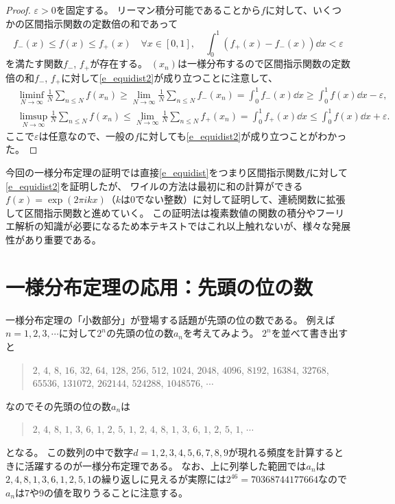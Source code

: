 \begin{proof}
$\varepsilon > 0$を固定する。
リーマン積分可能であることから$f$に対して、いくつかの区間指示関数の定数倍の和であって
$$
f_-(x) \le f(x) \le f_+(x) \quad \forall x \in [0, 1], \quad \int_0^1 (f_+(x)-f_-(x))\dd{x} < \varepsilon
$$
を満たす関数$f_-$, $f_+$が存在する。
$(x_n)$は一様分布するので区間指示関数の定数倍の和$f_-$, $f_+$に対して\eqref{e_equidist2}が成り立つことに注意して、
\begin{align*}
&\liminf_{N \to \infty}\frac{1}{N}\sum_{n \le N}f(x_n) \ge \lim_{N \to \infty}\frac{1}{N}\sum_{n \le N}f_-(x_n) = \int_0^1 f_-(x)\dd{x} \ge \int_0^1 f(x)\dd{x}-\varepsilon, \\
&\limsup_{N \to \infty}\frac{1}{N}\sum_{n \le N}f(x_n) \le \lim_{N \to \infty}\frac{1}{N}\sum_{n \le N}f_+(x_n) = \int_0^1 f_+(x)\dd{x} \le \int_0^1 f(x)\dd{x}+\varepsilon.
\end{align*}
ここで$\varepsilon$は任意なので、一般の$f$に対しても\eqref{e_equidist2}が成り立つことがわかった。
\end{proof}

\begin{remark}
今回の一様分布定理の証明では直接\eqref{e_equidist}をつまり区間指示関数$f$に対して\eqref{e_equidist2}を証明したが、
ワイルの方法は最初に和の計算ができる$f(x) = \exp(2\pi i k x)$（$k$は$0$でない整数）に対して証明して、連続関数に拡張して区間指示関数と進めていく。
この証明法は複素数値の関数の積分やフーリエ解析の知識が必要になるため本テキストではこれ以上触れないが、様々な発展性があり重要である。
\end{remark}

\section{一様分布定理の応用：先頭の位の数}

一様分布定理の「小数部分」が登場する話題が先頭の位の数である。
例えば$n = 1, 2, 3, \cdots$に対して$2^n$の先頭の位の数$a_n$を考えてみよう。
$2^n$を並べて書き出すと
\begin{quote}
$2$, $4$, $8$, $16$, $32$, $64$, $128$, $256$, $512$, $1024$, $2048$, $4096$, $8192$, $16384$, $32768$, $65536$, $131072$, $262144$, $524288$, $1048576$, $\cdots$
\end{quote}
なのでその先頭の位の数$a_n$は
\begin{quote}
$2$, $4$, $8$, $1$, $3$, $6$, $1$, $2$, $5$, $1$, $2$, $4$, $8$, $1$, $3$, $6$, $1$, $2$, $5$, $1$, $\cdots$
\end{quote}
となる。
この数列の中で数字$d = 1, 2, 3, 4, 5, 6, 7, 8, 9$が現れる頻度を計算するときに活躍するのが一様分布定理である。
なお、上に列挙した範囲では$a_n$は$2, 4, 8, 1, 3, 6, 1, 2, 5, 1$の繰り返しに見えるが実際には$2^{46} = 70368744177664$なので$a_n$は$7$や$9$の値を取りうることに注意する。


